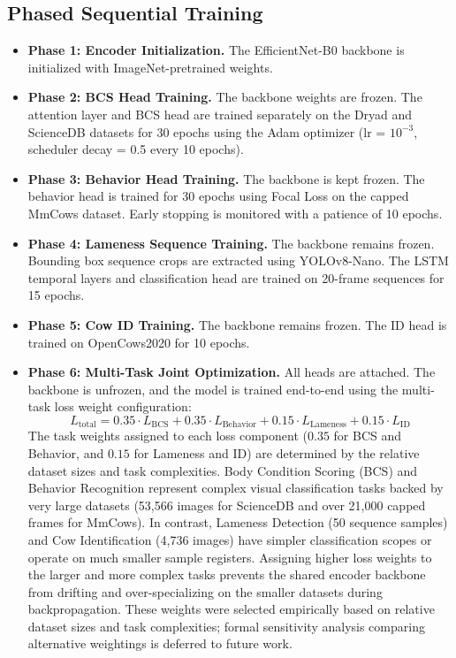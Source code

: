 \subsection{Phased Sequential Training}
\begin{itemize}
    \item \textbf{Phase 1: Encoder Initialization.} The EfficientNet-B0 backbone is initialized with ImageNet-pretrained weights.
    \item \textbf{Phase 2: BCS Head Training.} The backbone weights are frozen. The attention layer and BCS head are trained separately on the Dryad and ScienceDB datasets for 30 epochs using the Adam optimizer (lr = $10^{-3}$, scheduler decay = 0.5 every 10 epochs).
    \item \textbf{Phase 3: Behavior Head Training.} The backbone is kept frozen. The behavior head is trained for 30 epochs using Focal Loss on the capped MmCows dataset. Early stopping is monitored with a patience of 10 epochs.
    \item \textbf{Phase 4: Lameness Sequence Training.} The backbone remains frozen. Bounding box sequence crops are extracted using YOLOv8-Nano. The LSTM temporal layers and classification head are trained on 20-frame sequences for 15 epochs.
    \item \textbf{Phase 5: Cow ID Training.} The backbone remains frozen. The ID head is trained on OpenCows2020 for 10 epochs.
    \item \textbf{Phase 6: Multi-Task Joint Optimization.} All heads are attached. The backbone is unfrozen, and the model is trained end-to-end using the multi-task loss weight configuration:
    \begin{equation}
        L_{\text{total}} = 0.35 \cdot L_{\text{BCS}} + 0.35 \cdot L_{\text{Behavior}} + 0.15 \cdot L_{\text{Lameness}} + 0.15 \cdot L_{\text{ID}}
    \end{equation}
    The task weights assigned to each loss component ($0.35$ for BCS and Behavior, and $0.15$ for Lameness and ID) are determined by the relative dataset sizes and task complexities. Body Condition Scoring (BCS) and Behavior Recognition represent complex visual classification tasks backed by very large datasets (53,566 images for ScienceDB and over 21,000 capped frames for MmCows). In contrast, Lameness Detection (50 sequence samples) and Cow Identification (4,736 images) have simpler classification scopes or operate on much smaller sample registers. Assigning higher loss weights to the larger and more complex tasks prevents the shared encoder backbone from drifting and over-specializing on the smaller datasets during backpropagation. These weights were selected empirically based on relative dataset sizes and task complexities; formal sensitivity analysis comparing alternative weightings is deferred to future work.
\end{itemize}

